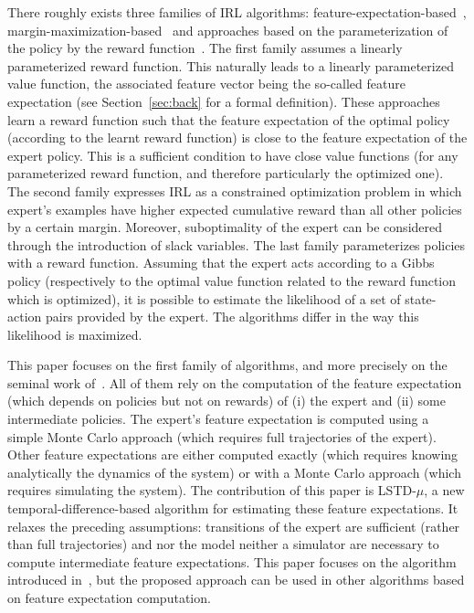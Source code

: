 \documentclass{llncs}
\begin{document}
There roughly exists three families of IRL algorithms:
feature-expectation-based~\citep{abbeel2004apprenticeship,syed2008apprenticeship,syed2008game,ziebart2008maximum},
margin-maximization-based~\citep{ratliff2006maximum,ratliff2007imitation,ratliff2007boosting,kolter2008hierarchical}
and approaches based on the parameterization of the policy by the
reward function~\citep{ramachandran2007bayesian,neu2007apprenticeship}. The first family
assumes a linearly parameterized reward function. This naturally
leads to a linearly parameterized value function, the associated
feature vector being the so-called feature expectation (see Section~\ref{sec:back} for a formal definition).
These approaches learn a reward function such that the feature
expectation of the optimal policy (according to the learnt reward
function) is close to the feature expectation of the expert policy.
This is a sufficient condition to have close value functions (for any parameterized reward function, and therefore particularly the optimized one). The
second family expresses IRL as a constrained optimization problem in
which expert's examples have higher expected cumulative reward than all other
policies by a certain margin. Moreover, suboptimality of the expert
can be considered through the introduction of slack variables. The
last family parameterizes policies with a reward function. Assuming
that the expert acts according to a Gibbs policy (respectively to
the optimal value function related to the reward function which is
optimized), it is possible to estimate the likelihood of a set of
state-action pairs provided by the expert. The algorithms differ in
the way this likelihood is maximized.

This paper focuses on the first family of algorithms, and more
precisely on the seminal work of~\citet{abbeel2004apprenticeship}. All of them
rely on the computation of the feature expectation (which depends on
policies but not on rewards) of (i) the expert and (ii) some
intermediate policies. The expert's feature expectation is computed
using a simple Monte Carlo approach (which requires full
trajectories of the expert). Other feature expectations are either
computed exactly (which requires knowing analytically the dynamics
of the system) or with a Monte Carlo approach (which requires simulating the system). The contribution of this paper is LSTD-$\mu$,
a new temporal-difference-based algorithm for estimating these feature
expectations. It relaxes the preceding assumptions: transitions
of the expert are sufficient (rather than full trajectories) and nor
the model neither a simulator are necessary to compute intermediate
feature expectations. This paper focuses on the algorithm introduced
in~\citep{abbeel2004apprenticeship}, but the proposed
approach can be used in other algorithms based on feature
expectation computation.
\end{document}
